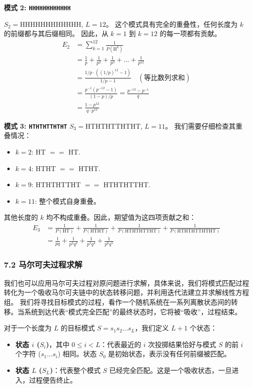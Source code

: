 \documentclass[UTF8]{ctexart}
\begin{document}
\textbf{模式 2: \texttt{HHHHHHHHHHHH}}

$S_2 = \text{HHHHHHHHHHHH}$, $L=12$。
这个模式具有完全的重叠性，任何长度为 $k$ 的前缀都与其后缀相同。
因此，从 $k=1$ 到 $k=12$ 的每一项都有贡献。
\begin{align*}
    E_2 &= \sum_{k=1}^{12} \frac{1}{P(\text{H}^k)} \\
        &= \frac{1}{p} + \frac{1}{p^2} + \frac{1}{p^3} + \dots + \frac{1}{p^{12}} \\
        &= \frac{1/p \cdot ((1/p)^{12} - 1)}{1/p - 1} \quad (\text{等比数列求和}) \\
        &= \frac{p^{-1}(p^{-12}-1)}{(1-p)/p} = \frac{p^{-13}-p^{-1}}{q} \\
        &= \frac{1-p^{12}}{q \cdot p^{12}}
\end{align*}

\textbf{模式 3: \texttt{HTHTHTTHTHT}}
$S_3 = \text{HTHTHTTHTHT}$, $L=11$。
我们需要仔细检查其重叠情况：
\begin{itemize}
    \item $k=2$: HT $==$ HT.
    \item $k=4$: HTHT $==$ HTHT.
    \item $k=9$: HTHTHTTHT $==$ HTHTHTTHT.
    \item $k=11$: 整个模式自身重叠。
\end{itemize}
其他长度的 $k$ 均不构成重叠。因此，期望值为这四项贡献之和：
\begin{align*}
    E_3 &= \frac{1}{P(\text{HT})} + \frac{1}{P(\text{HTHT})} + \frac{1}{P(\text{HTHTHTTHT})} + \frac{1}{P(\text{HTHTHTTHTHT})} \\
        &= \frac{1}{pq} + \frac{1}{p^2q^2} + \frac{1}{p^5q^4} + \frac{1}{p^6q^5}
\end{align*}



\subsubsection*{7.2 马尔可夫过程求解}
我们也可以应用马尔可夫过程对原问题进行求解，具体来说，我们将模式匹配过程转化为一个吸收马尔可夫链中的状态转移问题，并利用迭代法建立并求解线性方程组。
我们将寻找目标模式的过程，看作一个随机系统在一系列离散状态间的转移。当系统到达代表“模式完全匹配”的最终状态时，它将被“吸收”，过程结束。


对于一个长度为 $L$ 的目标模式 $S = s_1s_2...s_L$，我们定义 $L+1$ 个状态：
\begin{itemize}
    \item \textbf{状态 $i$ ($S_i$)}，其中 $0 \le i < L$：代表最近的 $i$ 次投掷结果恰好与模式 $S$ 的前 $i$ 个字符 ($s_1...s_i$) 相同。状态 $S_0$ 是初始状态，表示没有任何前缀被匹配。
    \item \textbf{状态 $L$ ($S_L$)}：代表整个模式 $S$ 已经完全匹配。这是一个吸收状态，一旦进入，过程便告终止。
\end{itemize}
\end{document}
